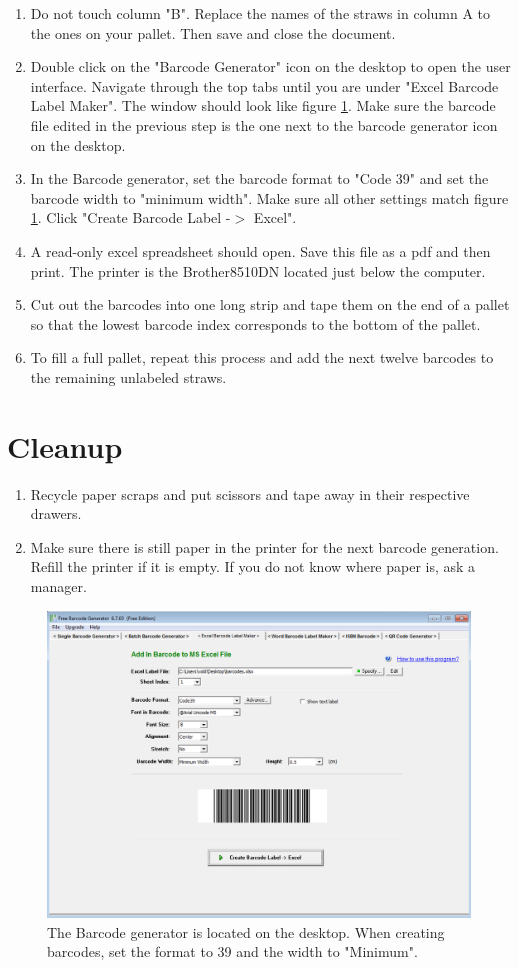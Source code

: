 \documentclass[letterpaper,12pt]{article}
\begin{document}
\begin{enumerate}
    \item Do not touch column "B". Replace the names of the straws in column A to the ones on your pallet.  Then save and close the document.
    \item Double click on the "Barcode Generator" icon on the desktop to open the user interface.  Navigate through the top tabs until you are under "Excel Barcode Label Maker".  The window should look like figure \ref{fig:dummy}.  Make sure the barcode file edited in the previous step is the one next to the barcode generator icon on the desktop.
    \item In the Barcode generator, set the barcode format to "Code 39" and set the barcode width to "minimum width".  Make sure all other settings match figure \ref{fig:dummy}.  Click "Create Barcode Label -$>$ Excel".
    \item A read-only excel spreadsheet should open.  Save this file as a pdf and then print.  The printer is the Brother8510DN located just below the computer.
     \item Cut out the barcodes into one long strip and tape them on the end of a pallet so that the lowest barcode index corresponds to the bottom of the pallet.
     \item To fill a full pallet, repeat this process and add the next twelve barcodes to the remaining unlabeled straws.
    \end{enumerate}
   
\section{Cleanup}
\begin{enumerate}
	\item Recycle paper scraps and put scissors and tape away in their respective drawers.
    \item Make sure there is still paper in the printer for the next barcode generation.  Refill the printer if it is empty.  If you do not know where paper is, ask a manager.

\end{enumerate}

 \begin{figure} [h]
		\centering
		\includegraphics[width=.75\textwidth]{BarcodeGeneratorSOP.png}
		\caption{The Barcode generator is located on the desktop.  When creating barcodes, set the format to 39 and the width to "Minimum".}
		\label{fig:dummy}
	\end{figure}
	
\end{document}
